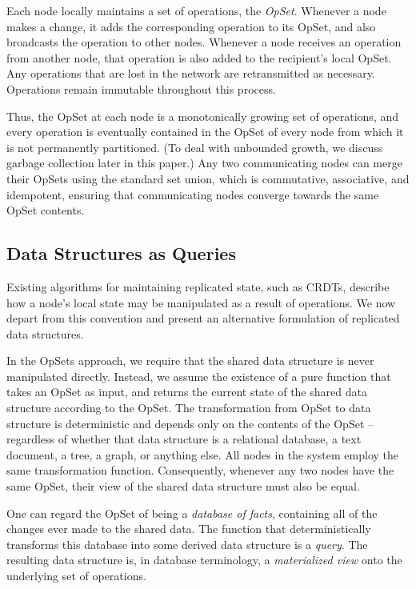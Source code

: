 Each node locally maintains a set of operations, the \emph{OpSet}.
Whenever a node makes a change, it adds the corresponding operation to its OpSet, and also broadcasts the operation to other nodes.
Whenever a node receives an operation from another node, that operation is also added to the recipient's local OpSet.
Any operations that are lost in the network are retransmitted as necessary.
Operations remain immutable throughout this process.

Thus, the OpSet at each node is a monotonically growing set of operations, and every operation is eventually contained in the OpSet of every node from which it is not permanently partitioned.
(To deal with unbounded growth, we discuss garbage collection later in this paper.)
Any two communicating nodes can merge their OpSets using the standard set union, which is commutative, associative, and idempotent, ensuring that communicating nodes converge towards the same OpSet contents.

\subsection{Data Structures as Queries}\label{sec:queries}

Existing algorithms for maintaining replicated state, such as CRDTs, describe how a node's local state may be manipulated as a result of operations.
We now depart from this convention and present an alternative formulation of replicated data structures.

In the OpSets approach, we require that the shared data structure is never manipulated directly.
Instead, we assume the existence of a pure function that takes an OpSet as input, and returns the current state of the shared data structure according to the OpSet.
The transformation from OpSet to data structure is deterministic and depends only on the contents of the OpSet -- regardless of whether that data structure is a relational database, a text document, a tree, a graph, or anything else.
All nodes in the system employ the same transformation function.
Consequently, whenever any two nodes have the same OpSet, their view of the shared data structure must also be equal.

One can regard the OpSet of being a \emph{database of facts}, containing all of the changes ever made to the shared data.
The function that deterministically transforms this database into some derived data structure is a \emph{query}.
The resulting data structure is, in database terminology, a \emph{materialized view} onto the underlying set of operations.

